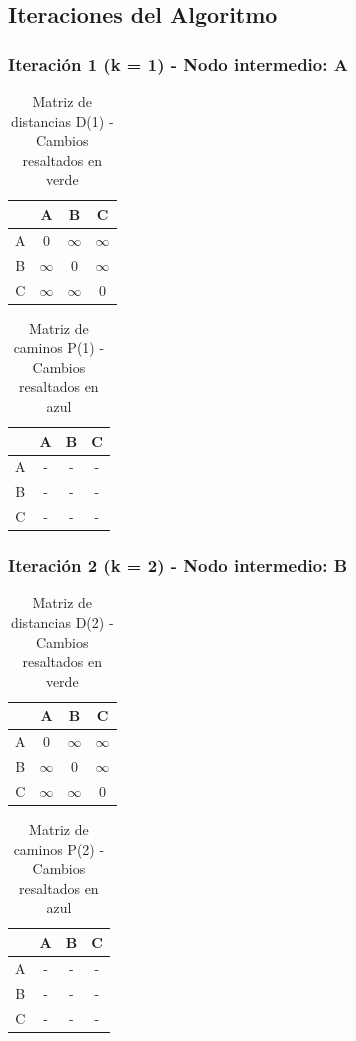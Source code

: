 \documentclass[12pt]{article}
\begin{document}
\clearpage
\subsection{Iteraciones del Algoritmo}
\subsubsection{Iteración 1 (k = 1) - Nodo intermedio: A}
\begin{table}[h!]
\centering
\begin{tabular}{|c|c|c|c|}
\hline
 & A & B & C \\\hline
A & 0 & $\infty$ & $\infty$ \\\hline
B & $\infty$ & 0 & $\infty$ \\\hline
C & $\infty$ & $\infty$ & 0 \\\hline
\end{tabular}
\caption{Matriz de distancias D(1) - Cambios resaltados en verde}
\end{table}

\begin{table}[h!]
\centering
\begin{tabular}{|c|c|c|c|}
\hline
 & A & B & C \\\hline
A & - & - & - \\\hline
B & - & - & - \\\hline
C & - & - & - \\\hline
\end{tabular}
\caption{Matriz de caminos P(1) - Cambios resaltados en azul}
\end{table}

\subsubsection{Iteración 2 (k = 2) - Nodo intermedio: B}
\begin{table}[h!]
\centering
\begin{tabular}{|c|c|c|c|}
\hline
 & A & B & C \\\hline
A & 0 & $\infty$ & $\infty$ \\\hline
B & $\infty$ & 0 & $\infty$ \\\hline
C & $\infty$ & $\infty$ & 0 \\\hline
\end{tabular}
\caption{Matriz de distancias D(2) - Cambios resaltados en verde}
\end{table}

\begin{table}[h!]
\centering
\begin{tabular}{|c|c|c|c|}
\hline
 & A & B & C \\\hline
A & - & - & - \\\hline
B & - & - & - \\\hline
C & - & - & - \\\hline
\end{tabular}
\caption{Matriz de caminos P(2) - Cambios resaltados en azul}
\end{table}
\end{document}
